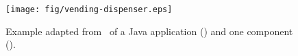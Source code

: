 \begin{figure}[!ht]
\begin{center}
\texttt{[image: fig/vending-dispenser.eps]}
\caption{\label{fig:vending}Example adapted from~\cite{Orso01UCMS}
of a Java application () and one component
().}
\end{center}
\end{figure}
